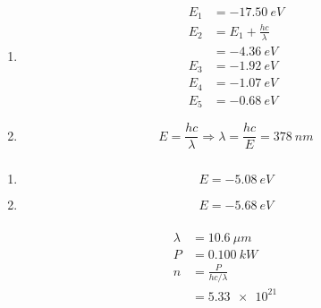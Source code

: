 \documentclass{article}
\begin{document}
\setcounter{subsubsection}{26}
\subsubsection{}

\begin{enumerate}
  \item

        \begin{align*}
          E_1 & = \qty{-17.50}{eV}          \\
          E_2 & = E_1 + \frac{h c}{\lambda} \\
              & = \qty{-4.36}{eV}           \\
          E_3 & = \qty{-1.92}{eV}           \\
          E_4 & = \qty{-1.07}{eV}           \\
          E_5 & = \qty{-0.68}{eV}
        \end{align*}

  \item \[E = \frac{h c}{\lambda} \Rightarrow \lambda = \frac{h c}{E} = \qty{378}{nm}\]
\end{enumerate}

\setcounter{subsubsection}{28}
\subsubsection{}

\begin{enumerate}
  \item \[E = \qty{-5.08}{eV}\]

  \item \[E = \qty{-5.68}{eV}\]
\end{enumerate}

\setcounter{subsubsection}{30}
\subsubsection{}

\begin{align*}
  \lambda & = \qty{10.6}{\mu m}       \\
  P       & = \qty{0.100}{kW}         \\
  n       & = \frac{P}{h c / \lambda} \\
          & = \num{5.33e21}
\end{align*}

\setcounter{subsubsection}{36}
\subsubsection{}
\end{document}
